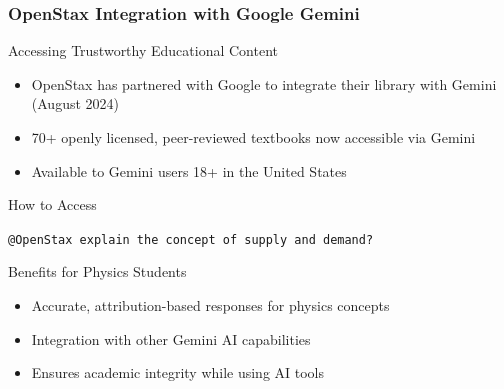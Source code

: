 \documentclass{beamer}
\begin{document}
\begin{frame}
\frametitle{OpenStax Integration with Google Gemini}

\begin{block}{Accessing Trustworthy Educational Content}
\begin{itemize}
\item OpenStax has partnered with Google to integrate their library with Gemini (August 2024)
\item 70+ openly licensed, peer-reviewed textbooks now accessible via Gemini
\item Available to Gemini users 18+ in the United States
\end{itemize}
\end{block}

\begin{exampleblock}{How to Access}
\begin{center}
\texttt{@OpenStax explain the concept of supply and demand?}
\end{center}
\end{exampleblock}

\begin{alertblock}{Benefits for Physics Students}
\begin{itemize}
\item Accurate, attribution-based responses for physics concepts
\item Integration with other Gemini AI capabilities
\item Ensures academic integrity while using AI tools
\end{itemize}
\end{alertblock}
\end{frame}
\end{document}

